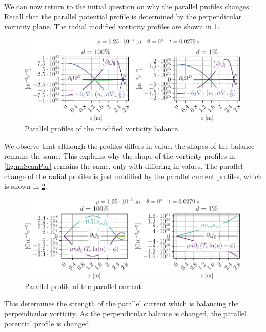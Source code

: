 We can now return to the initial question on why the parallel profiles changes.
Recall that the parallel potential profile is determined by the perpendicular vorticity plane.
The radial modified vorticity profiles are shown in \cref{fig:nnScanVortDPar}.
%
\begin{figure}[htb]
    \centering
    \includegraphics{fig/results/neutral/vortDBalanceNnComparePar}
    \caption{Parallel profiles of the modified vorticity balance.}
    \label{fig:nnScanVortDPar}
\end{figure}
%
We observe that although the profiles differs in value, the shapes of the balance remains the same.
This explains why the shape of the vorticity profiles in \cref{fig:nnScanPar} remains the same, only with differing in values.
The parallel change of the radial profiles is just modified by the parallel current profiles, which is shown in \cref{fig:nnScanJParPar}.
%
\begin{figure}[htb]
    \centering
    \includegraphics{fig/results/neutral/jParBalanceNnComparePar}
    \caption{Parallel profile of the parallel current.}
    \label{fig:nnScanJParPar}
\end{figure}
%
This determines the strength of the parallel current which is balancing the perpendicular vorticity.
As the perpendicular balance is changed, the parallel potential profile is changed.

